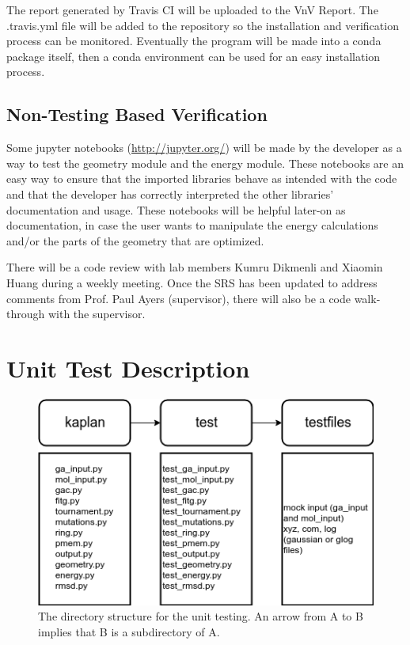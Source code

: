 \documentclass[12pt, titlepage]{article}
\begin{document}
The report generated by Travis CI will be uploaded to the VnV Report. The 
.travis.yml file will be added to the \progname{} repository so the 
installation and verification process can be monitored. Eventually the program 
will be made into a conda package itself, then a conda environment can be used 
for an easy installation process.  


\subsection{Non-Testing Based Verification}

Some jupyter notebooks (\url{http://jupyter.org/}) will be made by the 
developer as a way to test the geometry module and the energy module. These 
notebooks are an easy way to ensure that the imported libraries behave as 
intended with the \progname{} code and that the developer has correctly 
interpreted the other libraries' documentation and usage. These notebooks will 
be helpful later-on as documentation, in case the user wants to manipulate the 
energy calculations and/or the parts of the geometry that are optimized.

There will be a code review with lab members Kumru Dikmenli and Xiaomin Huang 
during a weekly meeting. Once the SRS has been updated to address comments from 
Prof. Paul Ayers (supervisor), there will also be a code walk-through with the 
supervisor.


\section{Unit Test Description}

\begin{figure}[H]
	\includegraphics[width=\textwidth]{directory-structure.png}
	\caption{The directory structure for the unit testing. An arrow from A to B 
		implies that B is a subdirectory of A.}
	\label{fig-dir-struct}
\end{figure}
\end{document}
